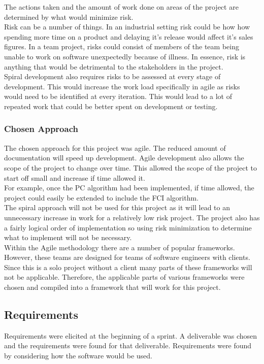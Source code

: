 \documentclass{article}
\begin{document}
The actions taken and the amount of work done on areas of the project are determined by what would minimize risk.\\

Risk can be a number of things. In an industrial setting risk could be how how spending more time on a product and delaying it's release would affect it's sales figures. In a team project, risks could  consist of members of the team being unable to work on software unexpectedly because of illness. In essence, risk is anything that would be detrimental to the stakeholders in the project.\\

Spiral development also requires risks to be assessed at every stage of development. This would increase the work load specifically in agile as risks would need to be identified at every iteration. This would lead to a lot of repeated work that could be better spent on development or testing.  
\subsubsection{Chosen Approach}

The chosen approach for this project was agile. The reduced amount of documentation will speed up development. Agile development also allows the scope of the project to change over time. This allowed the scope of the project to start off small and increase if time allowed it.\\

For example, once the PC algorithm had been implemented, if time allowed, the project could easily be extended to include the FCI algorithm.\\

The spiral approach will not be used for this project as it will lead to an unnecessary increase in work for a relatively low risk project. The project also has a fairly logical order of implementation so using risk minimization to determine what to implement will not be necessary.\\

Within the Agile methodology there are a number of popular frameworks. However, these teams are designed for teams of software engineers with clients. Since this is a solo project without a client many parts of these frameworks will not be applicable. Therefore, the applicable parts of various frameworks were chosen and compiled into a framework that will work for this project.


\subsection{Requirements}
Requirements were elicited at the beginning of a sprint. A deliverable was chosen and the requirements were found for that deliverable. Requirements were found by considering how the software would be used.
\end{document}
